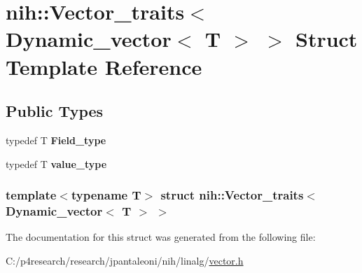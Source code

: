 \hypertarget{structnih_1_1_vector__traits_3_01_dynamic__vector_3_01_t_01_4_01_4}{
\section{nih\-:\-:\-Vector\-\_\-traits$<$ \-Dynamic\-\_\-vector$<$ \-T $>$ $>$ \-Struct \-Template \-Reference}
\label{structnih_1_1_vector__traits_3_01_dynamic__vector_3_01_t_01_4_01_4}
}
\subsection*{\-Public \-Types}
\begin{DoxyCompactItemize}
\item 
\hypertarget{structnih_1_1_vector__traits_3_01_dynamic__vector_3_01_t_01_4_01_4_a6752c55865e9e75cd5e1224f452ec59f}{
typedef \-T {\bfseries \-Field\-\_\-type}}
\label{structnih_1_1_vector__traits_3_01_dynamic__vector_3_01_t_01_4_01_4_a6752c55865e9e75cd5e1224f452ec59f}

\item 
\hypertarget{structnih_1_1_vector__traits_3_01_dynamic__vector_3_01_t_01_4_01_4_a05106651853193c1a6ea611214685d01}{
typedef \-T {\bfseries value\-\_\-type}}
\label{structnih_1_1_vector__traits_3_01_dynamic__vector_3_01_t_01_4_01_4_a05106651853193c1a6ea611214685d01}

\end{DoxyCompactItemize}
\subsubsection*{template$<$typename T$>$ struct nih\-::\-Vector\-\_\-traits$<$ Dynamic\-\_\-vector$<$ T $>$ $>$}



\-The documentation for this struct was generated from the following file\-:\begin{DoxyCompactItemize}
\item 
\-C\-:/p4research/research/jpantaleoni/nih/linalg/\hyperlink{vector_8h}{vector.\-h}\end{DoxyCompactItemize}
